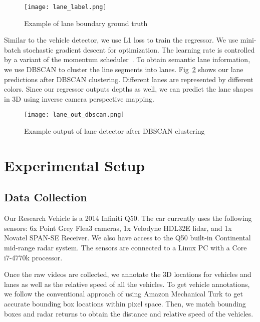 \documentclass[journal]{IEEEtran}
\begin{document}
\begin{figure}[tb]
  \centering
    \texttt{[image: lane\_label.png]}
 \caption{Example of lane boundary ground truth}
 \label{fig:lane-gt}
\end{figure}

Similar to the vehicle detector, we use L1 loss to train the regressor. We use mini-batch stochastic gradient descent for optimization. The learning rate is controlled by a variant of the momentum scheduler~\cite{sutskever-2013}. To obtain semantic lane information, we use DBSCAN to cluster the line segments into lanes. Fig~\ref{fig:lane-out-dbscan} shows our lane predictions after DBSCAN clustering. Different lanes are represented by different colors. Since our regressor outputs depths as well, we can predict the lane shapes in 3D using inverse camera perspective mapping.
 

\begin{figure}[tb]
  \centering
    \texttt{[image: lane\_out\_dbscan.png]}
 \caption{Example output of lane detector after DBSCAN clustering}
 \label{fig:lane-out-dbscan}
\end{figure}

\section{Experimental Setup}

\subsection{Data Collection}
Our Research Vehicle is a 2014 Infiniti Q50. The car currently uses the following sensors: 6x Point Grey Flea3 cameras, 1x Velodyne HDL32E lidar, and 1x Novatel SPAN-SE Receiver. We also have access to the Q50 built-in Continental mid-range radar system. The sensors are connected to a Linux PC with a Core i7-4770k processor. 

Once the raw videos are collected, we annotate the 3D locations for vehicles and lanes as well as the relative speed of all the vehicles. To get vehicle annotations, we follow the conventional approach of using Amazon Mechanical Turk to get accurate bounding box locations within pixel space. Then, we match bounding boxes and radar returns to obtain the distance and relative speed of the vehicles. 
\end{document}
